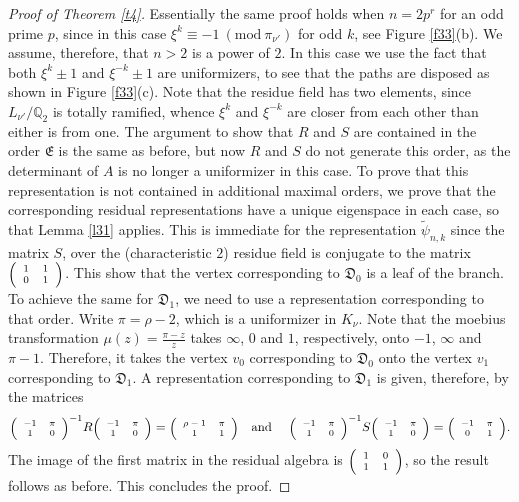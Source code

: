 \documentclass{article}
\theoremstyle{definition}
\theoremstyle{remark}
\newcommand\sbmattrix[4]{\textnormal{\scriptsize$\left(\begin{array}{cc}#1&#2\\#3&#4\end{array}\right)$\normalsize}}
\begin{document}
\begin{proof}[Proof of Theorem \ref{t4}]
Essentially the same proof holds when
$n=2p^r$ for an odd prime $p$, since in this
case $\xi^k\equiv-1\ (\mathrm{mod}\ \pi_{\nu'})$
for odd $k$, see Figure \ref{f33}(b).
We assume, therefore, that $n>2$
is a power of $2$. In this case we use the fact
that both $\xi^k\pm1$ and $\xi^{-k}\pm1$ are uniformizers,
to see that the paths are disposed as shown in Figure 
\ref{f33}(c). Note that the residue field has two elements,
since $L_{\nu'}/\mathbb{Q}_2$ is totally ramified,
whence $\xi^k$ and $\xi^{-k}$ are closer from each other than
either is from one. The argument to show that $R$ and $S$ are 
contained in the order $\mathfrak{E}$
is the same as before, but now $R$ and $S$ do not generate 
this order, as the determinant
of $A$ is no longer a uniformizer in this case.
To prove that this representation is not 
contained in additional maximal orders, we
prove that the corresponding residual
representations have a unique eigenspace in 
each case, so that Lemma \ref{l31} applies. 
This is immediate for the
representation $\tilde\psi_{n,k}$ since the
matrix $S$, over the (characteristic $2$)
residue field is conjugate to the matrix
$\sbmattrix 1101$. This show that the vertex
corresponding to $\mathfrak{D}_0$ is a
leaf of the branch. To achieve the same
for $\mathfrak{D}_1$, we need to use 
a representation corresponding to that order.
Write $\pi=\rho-2$, which is a uniformizer in
$K_\nu$.
Note that the moebius transformation
$\mu(z)=\frac{\pi-z}z$ takes $\infty$, $0$
and $1$, respectively, onto $-1$, $\infty$
and $\pi-1$. Therefore, it takes the vertex $v_0$
corresponding to $\mathfrak{D}_0$ onto
the vertex $v_1$ corresponding to 
$\mathfrak{D}_1$. A representation corresponding
to $\mathfrak{D}_1$ is given, therefore,
by the matrices $${\sbmattrix {-1}\pi10}^{-1}
R\sbmattrix {-1}\pi10=\sbmattrix {\rho-1}\pi11
\quad\textnormal{and }\quad
{\sbmattrix {-1}\pi10}^{-1}S
\sbmattrix {-1}\pi10=\sbmattrix {-1}\pi01.$$
The image of the first matrix in the residual algebra is $\sbmattrix 1011$, so the result follows as before. This concludes the proof.
\end{proof} 
\end{document}
